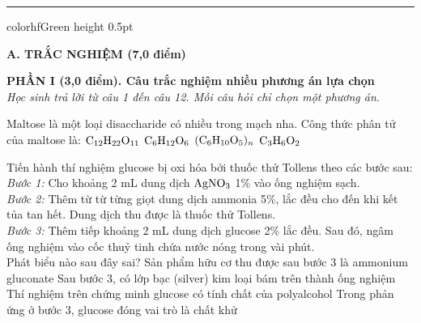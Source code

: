 \documentclass[11pt,a4paper]{article}
\begin{document}
\vspace{4pt}
\hrule color{hfGreen} height 0.5pt


\vspace{4pt}
\noindent
{\color{mainGreen}\textbf{\Large A. TRẮC NGHIỆM (7,0 điểm)}}

\vspace{3pt}
\noindent
{\color{mainGreen}\textbf{\large PHẦN I (3,0 điểm). Câu trắc nghiệm nhiều phương án lựa chọn}}\\
\textit{\small Học sinh trả lời từ câu 1 đến câu 12. Mỗi câu hỏi chỉ chọn một phương án.}
\vspace{2pt}


\begin{ex}
Maltose là một loại disaccharide có nhiều trong mạch nha. Công thức phân tử của maltose là:
\choice
{\True $\ce{C12H22O11}$}
{$\ce{C6H12O6}$}
{$(\ce{C6H10O5})_n$}
{$\ce{C3H6O2}$}



\end{ex}

\begin{ex}
Tiến hành thí nghiệm glucose bị oxi hóa bởi thuốc thử Tollens theo các bước sau:\\
\textit{Bước 1:} Cho khoảng 2 mL dung dịch $\ce{AgNO3}$ 1\% vào ống nghiệm sạch.\\
\textit{Bước 2:} Thêm từ từ từng giọt dung dịch ammonia 5\%, lắc đều cho đến khi kết tủa tan hết. Dung dịch thu được là thuốc thử Tollens.\\
\textit{Bước 3:} Thêm tiếp khoảng 2 mL dung dịch glucose 2\% lắc đều. Sau đó, ngâm ống nghiệm vào cốc thuỷ tinh chứa nước nóng trong vài phút.\\
Phát biểu nào sau đây sai?
\choice
{Sản phẩm hữu cơ thu được sau bước 3 là ammonium gluconate}
{Sau bước 3, có lớp bạc (silver) kim loại bám trên thành ống nghiệm}
{\True Thí nghiệm trên chứng minh glucose có tính chất của polyalcohol}
{Trong phản ứng ở bước 3, glucose đóng vai trò là chất khử}



\end{ex}
\end{document}
